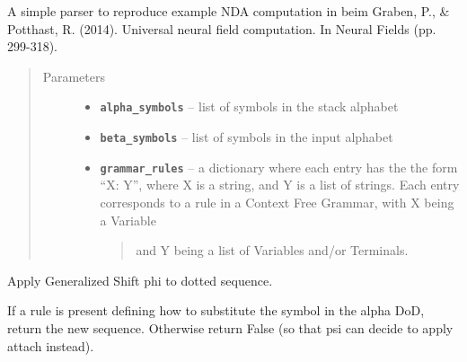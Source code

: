 \documentclass[letterpaper,10pt,english]{sphinxmanual}
\begin{document}

\begin{fulllineitems}
\label{symdyn_docs:symdyn.SimpleCFGeneralizedShift}
A simple parser to reproduce example NDA computation in beim
Graben, P., \& Potthast, R. (2014). Universal neural field
computation. In Neural Fields (pp. 299-318).
\begin{quote}\begin{description}
\item[{Parameters}] \leavevmode\begin{itemize}
\item {} 
\textbf{\texttt{alpha\_symbols}} -- list of symbols in the stack alphabet

\item {} 
\textbf{\texttt{beta\_symbols}} -- list of symbols in the input alphabet

\item {} 
\textbf{\texttt{grammar\_rules}} -- 
a dictionary where each entry has
the the form ``X: Y'', where X is a string, and Y is
a list of strings. Each entry corresponds to a rule
in a Context Free Grammar, with X being a Variable
\begin{quote}

and Y being a list of Variables and/or Terminals.
\end{quote}


\end{itemize}

\end{description}\end{quote}

\begin{fulllineitems}
\label{symdyn_docs:symdyn.SimpleCFGeneralizedShift.psi}
Apply Generalized Shift phi to dotted sequence.

\end{fulllineitems}


\begin{fulllineitems}
\label{symdyn_docs:symdyn.SimpleCFGeneralizedShift.predict}
If a rule is present defining how to substitute the symbol in the
alpha DoD, return the new sequence. Otherwise return False (so
that psi can decide to apply attach instead).


\end{fulllineitems}
\end{fulllineitems}
\end{document}

